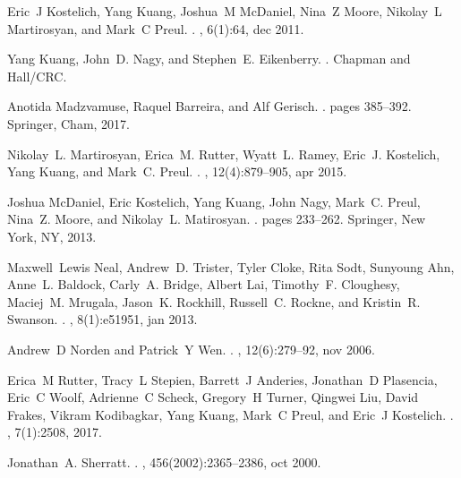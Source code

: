 \documentclass{aims}
\numberwithin{equation}{section}
\begin{document}
\begin{thebibliography}{10}
Eric~J Kostelich, Yang Kuang, Joshua~M McDaniel, Nina~Z Moore, Nikolay~L
  Martirosyan, and Mark~C Preul.
.
, 6(1):64, dec 2011.

Yang Kuang, John~D. Nagy, and Stephen~E. Eikenberry.
.
\newblock Chapman and Hall/CRC.

Anotida Madzvamuse, Raquel Barreira, and Alf Gerisch.
.
\newblock pages 385--392. Springer, Cham, 2017.

Nikolay~L. Martirosyan, Erica~M. Rutter, Wyatt~L. Ramey, Eric~J. Kostelich,
  Yang Kuang, and Mark~C. Preul.
.
, 12(4):879--905, apr
  2015.

Joshua McDaniel, Eric Kostelich, Yang Kuang, John Nagy, Mark~C. Preul, Nina~Z.
  Moore, and Nikolay~L. Matirosyan.
.
\newblock pages 233--262. Springer, New York, NY, 2013.

Maxwell~Lewis Neal, Andrew~D. Trister, Tyler Cloke, Rita Sodt, Sunyoung Ahn,
  Anne~L. Baldock, Carly~A. Bridge, Albert Lai, Timothy~F. Cloughesy, Maciej~M.
  Mrugala, Jason~K. Rockhill, Russell~C. Rockne, and Kristin~R. Swanson.
.
, 8(1):e51951, jan 2013.

Andrew~D Norden and Patrick~Y Wen.
.
, 12(6):279--92, nov 2006.

Erica~M Rutter, Tracy~L Stepien, Barrett~J Anderies, Jonathan~D Plasencia,
  Eric~C Woolf, Adrienne~C Scheck, Gregory~H Turner, Qingwei Liu, David Frakes,
  Vikram Kodibagkar, Yang Kuang, Mark~C Preul, and Eric~J Kostelich.
.
, 7(1):2508, 2017.

Jonathan~A. Sherratt.
.
, 456(2002):2365--2386, oct
  2000.


\end{thebibliography}
\end{document}
